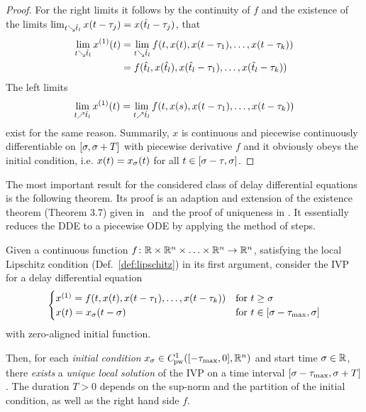 \begin{proof}
        For the right limits it follows by the continuity of $f$ and the existence of the limits $\lim_{t\searrow\hat{t}_l} x(t-\tau_j) = x(\hat{t}_l-\tau_j)$, that
        \begin{align*}
            \lim_{t\downto\hat{t}_l} \D{x}(t)
            &= \lim_{t\downto\hat{t}_l} f(t,x(t),x(t-\tau_1),\ldots,x(t-\tau_k))\\
            &= f(\hat{t}_l,x(\hat{t}_l),x(\hat{t}_l-\tau_1),\ldots,x(\hat{t}_l-\tau_k))
        \end{align*}
        The left limits
        \begin{equation*}
            \lim_{t\upto\hat{t}_l} \D{x}(t) = \lim_{t\upto\hat{t}_l} f(t,x(s),x(t-\tau_1),\ldots,x(t-\tau_k)) 
        \end{equation*}
        exist for the same reason.
        Summarily, $x$ is continuous and piecewise continuously differentiable on $[\sigma,\sigma+T]$ with piecewise derivative $f$ and it obviously obeys the initial condition, i.e. $x(t)=x_{\sigma}(t)$ for all $t\in[\sigma-\tau,\sigma]$.
    \end{proof}

    The most important result for the considered class of delay differential equations is the following theorem.
    Its proof is an adaption and extension of the existence theorem (Theorem 3.7) given in~\cite{Smith10IntroDDE} and the proof of uniqueness in \cite{PruessWilke10GewDiffGl}. It essentially reduces the DDE to a piecewise ODE by applying the method of steps.

    \begin{theorem}
        \label{thm:solution-existence}
        Given a continuous function $f\colon\mathbb{R}\times\mathbb{R}^n\times\ldots\times\mathbb{R}^n\to\mathbb{R}^n$, satisfying the local Lipschitz condition (Def.~\ref{def:lipschitz}) in its first argument, consider the IVP for a delay differential equation
        \begin{equation}
            \begin{cases}
                \D{x} = f(t,x(t),x(t-\tau_1),\ldots,x(t-\tau_k)) & \text{for } t\geq\tzero\\
                x(t) = x_\tzero(t-\tzero) & \text{for } t\in\compactum{\tzero-\taumax}{\tzero}
            \end{cases}
        \end{equation}
        with zero-aligned initial function.
        

        Then, for each \emph{initial condition} $x_{\tzero}\in\statespace[-\taumax]$ and start time $\sigma\in\mathbb{R}$, there \emph{exists} a \emph{unique local solution} of the IVP on a time interval $[\sigma-\tau_{\max},\sigma+T]$.
        The duration $T>0$ depends on the sup-norm and the partition of the initial condition, as well as the right hand side $f$.
    \end{theorem}

